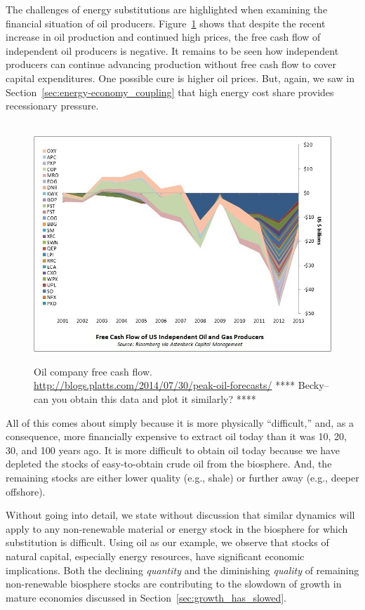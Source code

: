 The challenges of energy substitutions are highlighted
when examining the financial situation of oil producers.
Figure~\ref{fig:oil_company_free_cash_flow} 
shows that despite the recent increase in oil production
and continued high prices, 
the free cash flow of independent oil producers is negative.
It remains to be seen how independent producers can continue advancing 
production without free cash flow to cover capital expenditures.
One possible cure is higher oil prices.
But, again, we saw 
in Section~\ref{sec:energy-economy_coupling}
that high energy cost share 
provides recessionary pressure.

\begin{figure}[!ht]
\centering\
\includegraphics[width=\linewidth]{Part_0/Chapter_Introduction/images/Cash-Flow.jpg}
\caption[Oil company free cash flow]{Oil company free cash flow.
\url{http://blogs.platts.com/2014/07/30/peak-oil-forecasts/}
**** Becky--can you obtain this data and plot it similarly? ****
}
\label{fig:oil_company_free_cash_flow}
\end{figure}

All of this comes about simply because it is 
more physically ``difficult,'' and, as a consequence, 
more financially expensive
to extract oil today than it was 10, 20, 30, and 100 years ago.
It is more difficult to obtain oil today because we have depleted
the stocks of easy-to-obtain crude oil from the biosphere.
And, the remaining stocks are either lower quality (e.g., shale)
or further away (e.g., deeper offshore).

Without going into detail, we state without discussion 
that similar dynamics will apply to 
any non-renewable material or energy stock in the biosphere
for which substitution is difficult.
Using oil as our example, we observe that 
stocks of natural capital, especially energy resources,
have significant economic implications.
Both the declining \emph{quantity} and 
the diminishing \emph{quality} of remaining non-renewable biosphere stocks 
are contributing to the slowdown of growth in mature economies
discussed in Section~\ref{sec:growth_has_slowed}.

